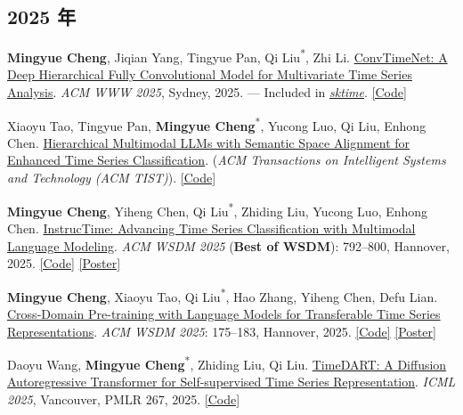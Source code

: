 \documentclass[UTF8,fontset=fandol,scheme=plain,11pt,a4paper]{ctexart}
\newcommand{\pubentry}[1]{\item \begin{minipage}[t]{\linewidth}#1\end{minipage}}
\begin{document}
\subsection{2025 年}
\begin{publist}[start=31]
\pubentry{\textbf{Mingyue Cheng}, Jiqian Yang, Tingyue Pan, Qi Liu\textsuperscript{*}, Zhi Li. \href{https://arxiv.org/pdf/2403.01493}{ConvTimeNet: A Deep Hierarchical Fully Convolutional Model for Multivariate Time Series Analysis}. \emph{ACM WWW 2025}, Sydney, 2025. --- Included in \href{https://www.sktime.net/en/stable/}{\emph{sktime}}. \href{https://github.com/Mingyue-Cheng/ConvTimeNet}{[Code]}}

\pubentry{Xiaoyu Tao, Tingyue Pan, \textbf{Mingyue Cheng}\textsuperscript{*}, Yucong Luo, Qi Liu, Enhong Chen. \href{https://arxiv.org/pdf/2410.18686}{Hierarchical Multimodal LLMs with Semantic Space Alignment for Enhanced Time Series Classification}. (\emph{ACM Transactions on Intelligent Systems and Technology (ACM TIST)}). \href{https://github.com/Xiaoyu-Tao/HiTime}{[Code]}}

\pubentry{\textbf{Mingyue Cheng}, Yiheng Chen, Qi Liu\textsuperscript{*}, Zhiding Liu, Yucong Luo, Enhong Chen. \href{https://dl.acm.org/doi/abs/10.1145/3701551.3703499}{InstrucTime: Advancing Time Series Classification with Multimodal Language Modeling}. \emph{ACM WSDM 2025} (\textbf{Best of WSDM}): 792--800, Hannover, 2025. \href{https://github.com/Mingyue-Cheng/InstructTime}{[Code]} \href{https://mingyue-cheng.github.io/files/posters/instructtime\_poster.pdf}{[Poster]}}

\pubentry{\textbf{Mingyue Cheng}, Xiaoyu Tao, Qi Liu\textsuperscript{*}, Hao Zhang, Yiheng Chen, Defu Lian. \href{https://arxiv.org/pdf/2403.12372.pdf}{Cross-Domain Pre-training with Language Models for Transferable Time Series Representations}. \emph{ACM WSDM 2025}: 175--183, Hannover, 2025. \href{https://github.com/Mingyue-Cheng/CrossTimeNet}{[Code]} \href{https://mingyue-cheng.github.io/files/posters/crosstimenet-poster.pdf}{[Poster]}}

\pubentry{Daoyu Wang, \textbf{Mingyue Cheng}\textsuperscript{*}, Zhiding Liu, Qi Liu. \href{https://arxiv.org/html/2410.05711v1}{TimeDART: A Diffusion Autoregressive Transformer for Self-supervised Time Series Representation}. \emph{ICML 2025}, Vancouver, PMLR 267, 2025. \href{https://github.com/Melmaphother/TimeDART}{[Code]}}


\end{publist}
\end{document}
